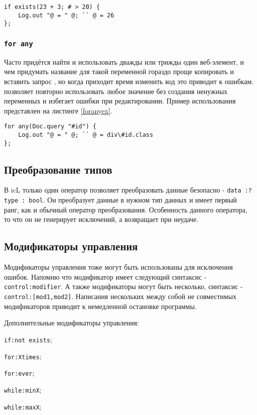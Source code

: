 \begin{lstlisting}[caption=Использование if exist, label=ifexistsex]
if exists(23 + 3; # > 20) {
	Log.out "@ = " @; `` @ = 26
};
\end{lstlisting}

\subsubsection{\lstinline|for any|}

Часто придётся найти и использовать дважды или трижды один веб-элемент, и чем придумать название для такой переменной гораздо проще копировать и вставить запрос , но когда приходит время изменить код это приводит к ошибкам.  позволяет повторно использовать любое значение без создания ненужных переменных и избегает ошибки при редактировании. Пример использования представлен на листинге \ref{foranyex}.

\begin{lstlisting}[caption=Использование for any, label=foranyex]
for any(Doc.query "#id") {
	Log.out "@ = " @; `` @ = div\#id.class
};
\end{lstlisting}

\subsection{Преобразование типов}

В icL только один оператор позволяет преобразовать данные безопасно - \lstinline|data :? type : bool|.
Он преобразует данные в нужном тип данных и имеет первый ранг, как и обычный оператор преобразования. Особенность данного оператора, то что он не генерирует исключений, а возвращает \void{} при неудаче.

\subsection{Модификаторы управления}

Модификаторы управления тоже могут быть использованы для исключения ошибок. Напомню что модификатор имеет следующий синтаксис - \lstinline|control:modifier|. А также модификаторы могут быть несколько, синтаксис - \lstinline|control:[mod1,mod2]|. Написания нескольких между собой не совместимых модификаторов приводит к немедленной остановке программы.

Дополнительные модификаторы управления:
\begin{icItems}
	\item \lstinline|if:not exists|;
	\item \lstinline|for:Xtimes|;
	\item \lstinline|for:ever|;
	\item \lstinline|while:minX|;
	\item \lstinline|while:maxX|;
\end{icItems}

